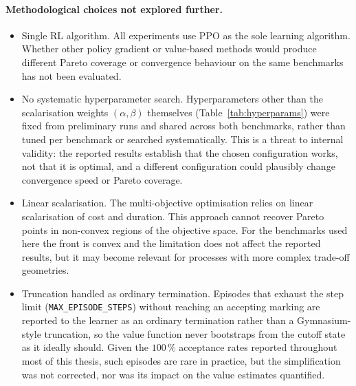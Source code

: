 \paragraph{Methodological choices not explored further.}

\begin{itemize}

    \item Single RL algorithm.
    All experiments use PPO as the sole learning algorithm.
    Whether other policy gradient or value-based methods would
    produce different Pareto coverage or convergence behaviour
    on the same benchmarks has not been evaluated.

    \item No systematic hyperparameter search.
    Hyperparameters other than the scalarisation weights
    $(\alpha,\beta)$ themselves (Table~\ref{tab:hyperparams}) were
    fixed from preliminary runs and shared across both benchmarks,
    rather than tuned per benchmark or searched systematically. This
    is a threat to internal validity: the reported results establish
    that the chosen configuration works, not that it is optimal, and
    a different configuration could plausibly change convergence
    speed or Pareto coverage.

    \item Linear scalarisation.
    The multi-objective optimisation relies on linear
    scalarisation of cost and duration.
    This approach cannot recover Pareto points in non-convex
    regions of the objective space.
    For the benchmarks used here the front is convex and
    the limitation does not affect the reported results,
    but it may become relevant for processes with more
    complex trade-off geometries.

    \item Truncation handled as ordinary termination.
    Episodes that exhaust the step limit (\texttt{MAX\_EPISODE\_STEPS})
    without reaching an accepting marking are reported to the learner
    as an ordinary termination rather than a Gymnasium-style
    truncation, so the value function never bootstraps from the
    cutoff state as it ideally should. Given the $100\,\%$ acceptance
    rates reported throughout most of this thesis, such episodes are
    rare in practice, but the simplification was not corrected, nor
    was its impact on the value estimates quantified.

\end{itemize}

